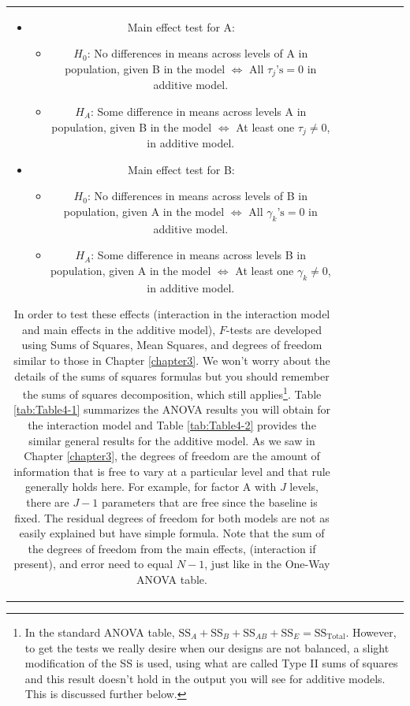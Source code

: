 \documentclass[]{book}
\let\rmarkdownfootnote\footnote%
\def\footnote{\protect\rmarkdownfootnote}
\theoremstyle{definition}
\theoremstyle{definition}
\theoremstyle{remark}
\begin{document}
\begin{longtable}[]{@{}ccccccc@{}}
\begin{minipage}[b]{0.10\columnwidth}
\begin{itemize}
\item
  Main effect test for A:

  \begin{itemize}
  \item
    \(H_0\): No differences in means across levels of A in population,
    given B in the model \(\Leftrightarrow\) All \(\tau_j\text{'s} = 0\)
    in additive model.
  \item
    \(H_A\): Some difference in means across levels A in population,
    given B in the model \(\Leftrightarrow\) At least one
    \(\tau_j \ne 0\), in additive model.
  \end{itemize}
\item
  Main effect test for B:

  \begin{itemize}
  \item
    \(H_0\): No differences in means across levels of B in population,
    given A in the model \(\Leftrightarrow\) All
    \(\gamma_k\text{'s} = 0\) in additive model.
  \item
    \(H_A\): Some difference in means across levels B in population,
    given A in the model \(\Leftrightarrow\) At least one
    \(\gamma_k \ne 0\), in additive model.
  \end{itemize}
\end{itemize}

In order to test these effects (interaction in the interaction model and
main effects in the additive model), \(F\)-tests are developed using
Sums of Squares, Mean Squares, and degrees of freedom similar to those
in Chapter \ref{chapter3}. We won't worry about the details of the sums
of squares formulas but you should remember the sums of squares
decomposition, which still applies\footnote{In the standard ANOVA table,
  \(\text{SS}_A + \text{SS}_B + \text{SS}_{AB} + \text{SS}_E = \text{SS}_{\text{Total}}\).
  However, to get the tests we really desire when our designs are not
  balanced, a slight modification of the SS is used, using what are
  called Type II sums of squares and this result doesn't hold in the
  output you will see for additive models. This is discussed further
  below.}. Table \ref{tab:Table4-1} summarizes the ANOVA results you
will obtain for the interaction model and Table \ref{tab:Table4-2}
provides the similar general results for the additive model. As we saw
in Chapter \ref{chapter3}, the degrees of freedom are the amount of
information that is free to vary at a particular level and that rule
generally holds here. For example, for factor A with \(J\) levels, there
are \(J-1\) parameters that are free since the baseline is fixed. The
residual degrees of freedom for both models are not as easily explained
but have simple formula. Note that the sum of the degrees of freedom
from the main effects, (interaction if present), and error need to equal
\(N-1\), just like in the One-Way ANOVA table.




\end{minipage}
\end{longtable}
\end{document}
